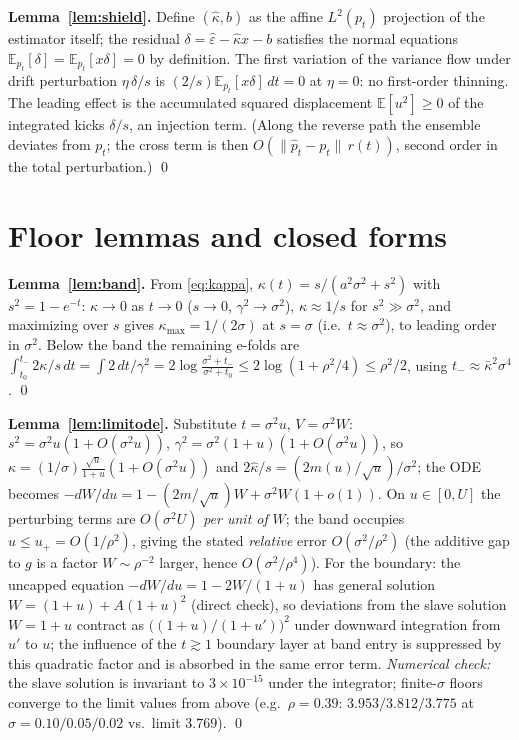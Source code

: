 \documentclass[11pt]{article}
\theoremstyle{remark}
\newcommand{\kb}{\bar\kappa}
\newcommand{\epshat}{\hat\varepsilon}
\newcommand{\E}{\mathbb{E}}
\newcommand{\sigsq}{\sigma^2}
\begin{document}
\textbf{Lemma~\ref{lem:shield}.} Define $(\hat\kappa,b)$ as the affine $L^2(p_t)$
projection of the estimator itself; the residual $\delta=\epshat-\hat\kappa x-b$
satisfies the normal equations $\E_{p_t}[\delta]=\E_{p_t}[x\delta]=0$ by definition. The
first variation of the variance flow under drift perturbation $\eta\,\delta/s$ is
$(2/s)\E_{p_t}[x\delta]\,dt=0$ at $\eta=0$: no first-order thinning. The leading effect
is the accumulated squared displacement $\E[u^2]\ge0$ of the integrated kicks
$\delta/s$, an injection term. (Along the reverse path the ensemble deviates from $p_t$; the
cross term is then $O(\|\hat p_t-p_t\|\,r(t))$, second order in the total perturbation.)
\qed

\section{Floor lemmas and closed forms}\label{app:floor}

\textbf{Lemma~\ref{lem:band}.} From \eqref{eq:kappa}, $\kappa(t)=s/(a^2\sigsq+s^2)$
with $s^2=1-e^{-t}$: $\kappa\to0$ as $t\to0$ ($s\to0$, $\gamma^2\to\sigsq$),
$\kappa\approx1/s$ for $s^2\gg\sigsq$, and maximizing over $s$ gives
$\kappa_{\max}=1/(2\sigma)$ at $s=\sigma$ (i.e.\ $t\approx\sigsq$), to leading order in
$\sigsq$. Below the band the remaining e-folds are
$\int_{t_0}^{t_-}2\kappa/s\,dt=\int 2\,dt/\gamma^2=2\log\frac{\sigsq+t_-}{\sigsq+t_0}
\le2\log(1+\rho^2/4)\le\rho^2/2$, using $t_-\approx\kb^2\sigma^4$. \qed

\textbf{Lemma~\ref{lem:limitode}.} Substitute $t=\sigsq u$, $V=\sigsq W$:
$s^2=\sigsq u(1+O(\sigsq u))$, $\gamma^2=\sigsq(1+u)(1+O(\sigsq u))$, so
$\kappa=(1/\sigma)\frac{\sqrt u}{1+u}(1+O(\sigsq u))$ and
$2\hat\kappa/s=(2m(u)/\sqrt u)/\sigsq$; the ODE becomes
$-dW/du=1-(2m/\sqrt u)W+\sigsq W(1+o(1))$. On $u\in[0,U]$ the perturbing terms are
$O(\sigsq U)$ \emph{per unit of} $W$; the band occupies $u\le u_+=O(1/\rho^2)$, giving
the stated \emph{relative} error $O(\sigsq/\rho^2)$ (the additive gap to $g$ is a factor
$W\sim\rho^{-2}$ larger, hence $O(\sigsq/\rho^4)$). For the boundary: the uncapped equation
$-dW/du=1-2W/(1+u)$ has general solution $W=(1+u)+A(1+u)^2$ (direct check), so
deviations from the slave solution $W=1+u$ contract as $\big((1+u)/(1+u')\big)^2$ under
downward integration from $u'$ to $u$; the influence of the $t\gtrsim1$ boundary layer
at band entry is suppressed by this quadratic factor and is absorbed in the same error
term. \emph{Numerical check:} the slave solution is invariant to $3\times10^{-15}$ under
the integrator; finite-$\sigma$ floors converge to the limit values from above
(e.g.\ $\rho=0.39$: $3.953/3.812/3.775$ at $\sigma=0.10/0.05/0.02$ vs.\ limit $3.769$).
\qed
\end{document}
